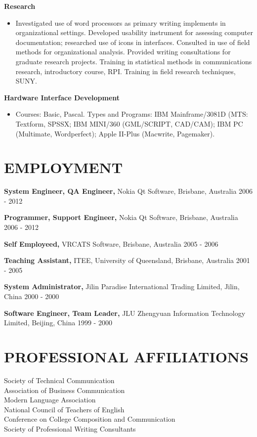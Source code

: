 \documentclass{res}
\begin{document}
\begin{resume}
   {\bf  Research} 
        \begin{itemize}
        \item[]  Investigated use of word processors as primary writing 
        implements in organizational settings. Developed 
        usability instrument for assessing computer 
        documentation; researched use of icons in interfaces. 
        Consulted in use of field methods for organizational 
        analysis. Provided writing consultations for graduate 
        research projects. Training in statistical methods in 
        communications research, introductory course, RPI. 
        Training in field research techniques, SUNY. 
       \end{itemize} 

   {\bf Hardware Interface Development} 
        \begin{itemize}
        \item[] Courses: Basic, Pascal. Types and Programs: IBM 
        Mainframe/3081D (MTS: Textform, SPSSX; IBM MINI/360 
        (GML/SCRIPT, CAD/CAM); IBM PC (Multimate, Wordperfect); 
        Apple II-Plus (Macwrite, Pagemaker). 
        \end{itemize}
 
\section{EMPLOYMENT} 
\vspace{0.1in} 
    {\bf System Engineer, QA Engineer,} Nokia Qt Software, Brisbane, Australia
    2006 - 2012
 
    {\bf Programmer, Support Engineer,} Nokia Qt Software, Brisbane, Australia
    2006 - 2012
 
    {\bf Self Employeed,} VRCATS Software, Brisbane, Australia
    2005 - 2006
 
    {\bf Teaching Assistant,} ITEE, University of Queensland, Brisbane, Australia 
    2001 - 2005 
 
    {\bf System Administrator,} Jilin Paradise International Trading Limited, Jilin, China
    2000 - 2000
 
    {\bf Software Engineer, Team Leader,} JLU Zhengyuan Information Technology Limited, Beijing, China
    1999 - 2000
 
 
\section{PROFESSIONAL AFFILIATIONS} 
\vspace{0.1in} 
    Society of Technical Communication \\
    Association of Business Communication \\
    Modern Language Association \\
    National Council of Teachers of English \\
    Conference on College Composition and Communication \\
    Society of Professional Writing Consultants 


\end{resume}
\end{document}

